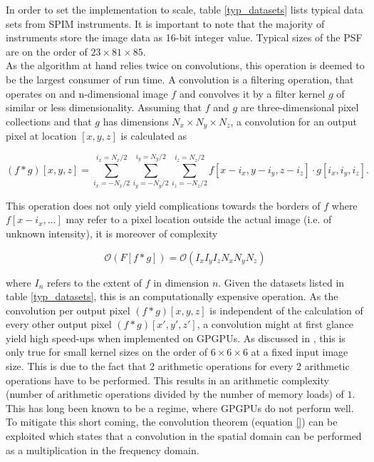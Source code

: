 In order to set the implementation to scale, table \ref{typ_datasets} lists typical data sets from SPIM instruments. It is important to note that the majority of instruments store the image data as 16-bit integer value. Typical sizes of the PSF are on the order of $23 \times 81 \times 85$. \\

As the algorithm at hand relies twice on convolutions, this operation is deemed to be the largest consumer of run time. A convolution is a filtering operation, that operates on and n-dimensional image $f$ and convolves it by a filter kernel $g$ of similar or less dimensionality. Assuming that $f$ and $g$ are three-dimensional pixel collections and that $g$ has dimensions $N_{x} \times N_{y} \times N_{z}$, a convolution for an output pixel at location $[x,y,z]$ is calculated as 

\begin{equation}
  \label{eq:disc_convolve}
  (f \ast g)[x,y,z] = \sum^{i_x = N_{x}/2}_{i_x = -N_{x}/2} \sum^{i_y = N_{y}/2}_{i_y = -N_{y}/2} \sum^{i_z = N_{z}/2}_{i_z = -N_{z}/2} f[x-i_x,y-i_y,z-i_z] \cdot g[i_x,i_y,i_z].
\end{equation}

This operation does not only yield complications towards the borders of $f$ where $f[x-i_x,\dots]$ may refer to a pixel location outside the actual image (i.e. of unknown intensity), it is moreover of complexity 

\begin{equation}
\label{eq:discrete_convol_complexity}
\mathcal{O}(F[f \ast g]) = \mathcal{O}(I_{x} I_{y} I_{z} N_{x} N_{y} N_{z})
\end{equation}


where $I_{n}$ refers to the extent of $f$ in dimension $n$. Given the datasets listed in table \ref{typ_datasets}, this is an computationally expensive operation. As the convolution per output pixel $(f \ast g)[x,y,z]$ is independent of the calculation of every other output pixel $(f \ast g)[x',y',z']$, a convolution might at first glance yield high speed-ups when implemented on GPGPUs. As discussed in \cite{eklund_nonseparable_filtering}, this is only true for small kernel sizes on the order of $6 \times 6 \times 6$ at a fixed input image size. This is due to the fact that 2 arithmetic operations for every 2 arithmetic operations have to be performed. This results in an arithmetic complexity (number of arithmetic operations divided by the number of memory loads) of $1$. This has long been known \cite{massively_parallel_book} to be a regime, where GPGPUs do not perform well. To mitigate this short coming, the convolution theorem (equation \ref{}) can be exploited which states that a convolution in the spatial domain can be performed as a multiplication in the frequency domain.

